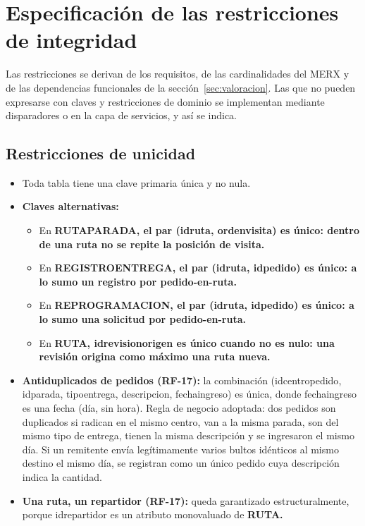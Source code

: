 \documentclass[11pt,a4paper]{article}
\newcommand{\ubrk}{\textunderscore\allowbreak}
\newcommand{\campo}[1]{\textnormal{\ttfamily\let\_\ubrk #1}}
\newcommand{\tabla}[1]{\begingroup\sffamily\bfseries\let\_\ubrk #1\endgroup}
\begin{document}
\section{Especificación de las restricciones de integridad}

Las restricciones se derivan de los requisitos, de las cardinalidades del MERX y de las dependencias funcionales de la sección~\ref{sec:valoracion}. Las que no pueden expresarse con claves y restricciones de dominio se implementan mediante disparadores o en la capa de servicios, y así se indica.

\subsection{Restricciones de unicidad}
\begin{itemize}
\item Toda tabla tiene una clave primaria única y no nula.
\item \textbf{Claves alternativas:}
  \begin{itemize}
  \item En \tabla{RUTA\_PARADA}, el par (\campo{id\_ruta}, \campo{orden\_visita}) es único: dentro de una ruta no se repite la posición de visita.
  \item En \tabla{REGISTRO\_ENTREGA}, el par (\campo{id\_ruta}, \campo{id\_pedido}) es único: a lo sumo un registro por pedido-en-ruta.
  \item En \tabla{REPROGRAMACION}, el par (\campo{id\_ruta}, \campo{id\_pedido}) es único: a lo sumo una solicitud por pedido-en-ruta.
  \item En \tabla{RUTA}, \campo{id\_revision\_origen} es único cuando no es nulo: una revisión origina como máximo una ruta nueva.
  \end{itemize}
\item \textbf{Antiduplicados de pedidos (RF-17):} la combinación (\campo{id\_centro\_pedido}, \campo{id\_parada}, \campo{tipo\_entrega}, \campo{descripcion}, \campo{fecha\_ingreso}) es única, donde \campo{fecha\_ingreso} es una fecha (día, sin hora). Regla de negocio adoptada: dos pedidos son duplicados si radican en el mismo centro, van a la misma parada, son del mismo tipo de entrega, tienen la misma descripción y se ingresaron el mismo día. Si un remitente envía legítimamente varios bultos idénticos al mismo destino el mismo día, se registran como un único pedido cuya descripción indica la cantidad.
\item \textbf{Una ruta, un repartidor (RF-17):} queda garantizado estructuralmente, porque \campo{id\_repartidor} es un atributo monovaluado de \tabla{RUTA}.
\end{itemize}
\end{document}
